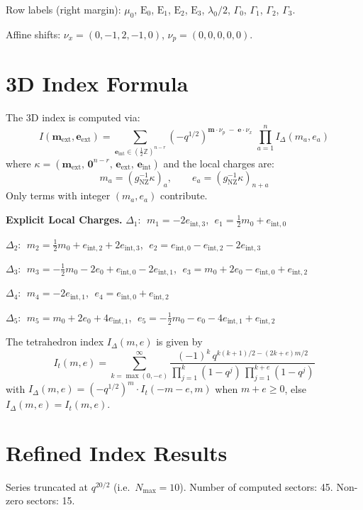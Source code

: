 \documentclass[11pt,a4paper]{article}
\newcommand{\IDelta}{I_{\Delta}}
\begin{document}
Row labels (right margin): 
$\mu_{0}$, $\text{E}_{0}$, $\text{E}_{1}$, $\text{E}_{2}$, $\text{E}_{3}$, $\lambda_{0}/2$, $\Gamma_{0}$, $\Gamma_{1}$, $\Gamma_{2}$, $\Gamma_{3}$.

Affine shifts: $\nu_x = (0, -1, 2, -1, 0)$, $\nu_p = (0, 0, 0, 0, 0)$.

\section{3D Index Formula}
The 3D index is computed via:
\[
  I(\mathbf{m}_{\text{ext}}, \mathbf{e}_{\text{ext}}) = \sum_{\mathbf{e}_{\text{int}} \in (\tfrac{1}{2}\mathbb{Z})^{n-r}} (-q^{1/2})^{\mathbf{m} \cdot \nu_p \;-\; \mathbf{e} \cdot \nu_x} \;\prod_{a=1}^{n} \IDelta(m_a, e_a)
\]
where $\kappa = (\mathbf{m}_{\text{ext}},\, \mathbf{0}^{n-r},\, \mathbf{e}_{\text{ext}},\, \mathbf{e}_{\text{int}})$ and the local charges are:
\[
  m_a = (g_{\text{NZ}}^{-1}\kappa)_a, \qquad   e_a = (g_{\text{NZ}}^{-1}\kappa)_{n+a}
\]
Only terms with integer $(m_a, e_a)$ contribute.

\noindent\textbf{Explicit Local Charges.}
$\Delta_{1}$: $\;m_{1} = -2e_{\text{int},3}$, $\;e_{1} = \tfrac{1}{2}m_{0} + e_{\text{int},0}$

$\Delta_{2}$: $\;m_{2} = \tfrac{1}{2}m_{0} + e_{\text{int},2} + 2e_{\text{int},3}$, $\;e_{2} = e_{\text{int},0} - e_{\text{int},2} - 2e_{\text{int},3}$

$\Delta_{3}$: $\;m_{3} = -\tfrac{1}{2}m_{0} - 2e_{0} + e_{\text{int},0} - 2e_{\text{int},1}$, $\;e_{3} = m_{0} + 2e_{0} - e_{\text{int},0} + e_{\text{int},2}$

$\Delta_{4}$: $\;m_{4} = -2e_{\text{int},1}$, $\;e_{4} = e_{\text{int},0} + e_{\text{int},2}$

$\Delta_{5}$: $\;m_{5} = m_{0} + 2e_{0} + 4e_{\text{int},1}$, $\;e_{5} = -\tfrac{1}{2}m_{0} - e_{0} - 4e_{\text{int},1} + e_{\text{int},2}$

The tetrahedron index $\IDelta(m, e)$ is given by
\[
  I_t(m, e) = \sum_{k=\max(0,-e)}^{\infty} \frac{(-1)^k \, q^{k(k+1)/2 - (2k+e)m/2}}{\prod_{j=1}^{k}(1-q^j) \,\prod_{j=1}^{k+e}(1-q^j)}
\]
with $\IDelta(m,e) = (-q^{1/2})^m \cdot I_t(-m-e, m)$ when $m + e \ge 0$, else $\IDelta(m,e) = I_t(m, e)$.

\section{Refined Index Results}
Series truncated at $q^{20/2}$ (i.e.\ $N_{\max} = 10$).
Number of computed sectors: 45.
Non-zero sectors: 15.
\end{document}
